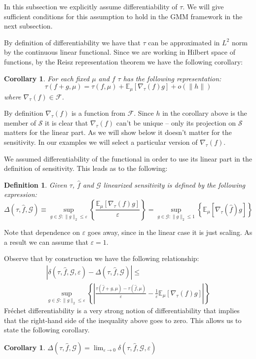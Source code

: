 \documentclass[12pt]{article}
\theoremstyle{plain}
\newtheorem{corollary}[theorem]{Corollary}
\newtheorem{definition}[theorem]{Definition}
\begin{document}
In this subsection we explicitly assume differentiability of $\tau$. We will give sufficient conditions for this assumption to hold in the GMM framework in the next subsection.


By definition of differentiability we have that $\tau$ can be approximated in $L^2$ norm by the continuous linear functional. Since we are working in Hilbert space of functions, by the Reisz representation theorem we have the following corollary:
\begin{corollary}\label{cor_1}For each fixed $\mu$ and $f$ $\tau$ has the following representation:
\begin{equation}
\tau(f+g,\mu) = \tau(f,\mu) + \mathbb{E}_{\mu}[\nabla_{\tau}(f)g] + o(\|h\|)
\end{equation}
where $\nabla_{\tau}(f) \in \mathcal{F}$.
\end{corollary}

By definition $\nabla_{\tau}(f)$ is a function from $\mathcal{F}$. Since $h$ in the corollary above is the member of $\mathcal{S}$ it is clear that $\nabla_{\tau}(f)$ can't be unique -- only its projection on $\mathcal{S}$ matters for the linear part. As we will show below it doesn't matter for the sensitivity. In our examples we will select a particular version of $\nabla_{\tau}(f)$.

We assumed differentiability of the functional in order to use its linear part in the definition of sensitivity. This leads as to the following:
\begin{definition}
Given $\tau$, $\hat f$ and $\mathcal{G}$ linearized sensitivity is defined by the following expression:
\begin{equation}
\Delta(\tau,\hat f,\mathcal{G})\equiv \sup_{g\in \mathcal{G}: \| g\|_2 \le \varepsilon}\left\{\frac{\mathbb{E}_{\mu}[\nabla_{\tau}(f)g]}{\varepsilon}\right\} =  \sup_{g\in \mathcal{G}: \| g\|_2 \le 1}\left\{\mathbb{E}_{\mu}[\nabla_{\tau}(\hat f)g]\right\} 
\end{equation}
\end{definition}
\noindent Note that dependence on $\varepsilon$ goes away, since in the linear case it is just scaling. As a result we can assume that $\varepsilon = 1$.

Observe that by construction we have the following relationship:
\begin{multline}
|\delta(\tau, \hat f, \mathcal{G},\varepsilon)-\Delta(\tau,\hat f,\mathcal{G})| \le\\
  \sup_{g\in \mathcal{G}: \| g\|_2 \le \varepsilon}\left\{\left|\frac{\tau(\hat f+g,\mu)-\tau(\hat f, \mu)}{\varepsilon}- \frac1{\varepsilon}\mathbb{E}_{\mu}[\nabla_{\tau}(f)g] \right|\right\}
\end{multline}
Fr\'echet differentiability is a very strong notion of differentiability that implies that the right-hand side of the inequality above goes to zero. This allows us to state the following corollary. 
\begin{corollary}  
$\Delta(\tau,\hat f,\mathcal{G}) = \lim_{\varepsilon\rightarrow 0} \delta(\tau, \hat f, \mathcal{G},\varepsilon)$
\end{corollary}
\end{document}
